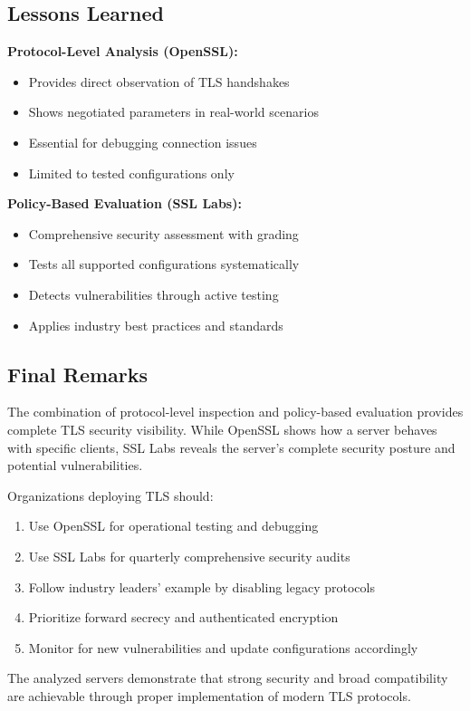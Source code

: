 \documentclass[12pt,a4paper]{article}
\begin{document}
\subsection{Lessons Learned}

\textbf{Protocol-Level Analysis (OpenSSL):}
\begin{itemize}
    \item Provides direct observation of TLS handshakes
    \item Shows negotiated parameters in real-world scenarios
    \item Essential for debugging connection issues
    \item Limited to tested configurations only
\end{itemize}

\textbf{Policy-Based Evaluation (SSL Labs):}
\begin{itemize}
    \item Comprehensive security assessment with grading
    \item Tests all supported configurations systematically
    \item Detects vulnerabilities through active testing
    \item Applies industry best practices and standards
\end{itemize}

\subsection{Final Remarks}

The combination of protocol-level inspection and policy-based evaluation provides complete TLS security visibility. While OpenSSL shows how a server behaves with specific clients, SSL Labs reveals the server's complete security posture and potential vulnerabilities.

Organizations deploying TLS should:
\begin{enumerate}
    \item Use OpenSSL for operational testing and debugging
    \item Use SSL Labs for quarterly comprehensive security audits
    \item Follow industry leaders' example by disabling legacy protocols
    \item Prioritize forward secrecy and authenticated encryption
    \item Monitor for new vulnerabilities and update configurations accordingly
\end{enumerate}

The analyzed servers demonstrate that strong security and broad compatibility are achievable through proper implementation of modern TLS protocols.
\end{document}
